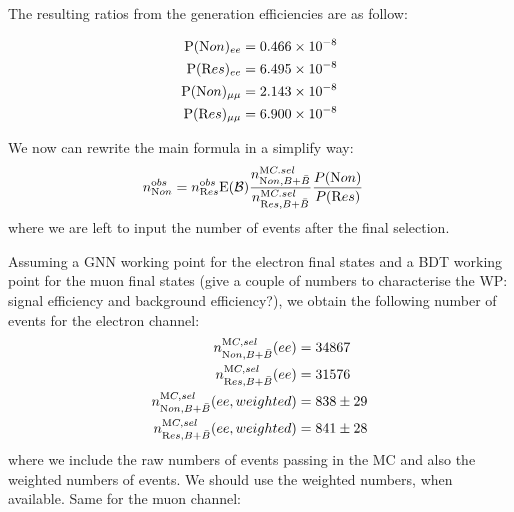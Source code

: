 
The resulting ratios from the generation efficiencies are as follow:

\begin{align}
{\textrm P}(\textrm Non)_{ee} = 0.466 \times 10^{-8}\\
{\textrm P}(\textrm Res)_{ee} = 6.495 \times 10^{-8}\\
{\textrm P}(\textrm Non)_{\mu\mu} = 2.143 \times 10^{-8}\\
{\textrm P}(\textrm Res)_{\mu\mu} = 6.900 \times 10^{-8}
\end{align}

We now can rewrite the main formula in a simplify way:
\begin{align}
n^{\textrm obs}_{\textrm Non} &= 
n^{\textrm obs}_{\textrm Res}
{\textrm E}(\mathcal{B})
\frac{n_{{\textrm Non},B+\bar B}^{\textrm MC.sel}}{n_{{\textrm Res},B+\bar B}^{\textrm MC.sel}}
\frac{P({\textrm Non})}{P({\textrm Res})}
\end{align}
where we are left to input the number of events after
the final selection.


Assuming a GNN working point for the electron final states
and a BDT working point for the muon final states
(give a couple of numbers to characterise the WP:
signal efficiency and background efficiency?),
we obtain the following number of events for the electron channel:
\begin{align}
  n_{{\textrm Non},{B+\bar B}}^{\textrm MC,sel}(ee) &= 34867\\
  n_{{\textrm Res},{B+\bar B}}^{\textrm MC,sel}(ee) &= 31576\\
  n_{{\textrm Non},B+\bar{B}}^{\textrm MC, sel}(ee,weighted) &= 838 \pm 29\\
  n_{{\textrm Res},B+\bar{B}}^{\textrm MC, sel}(ee,weighted) &= 841 \pm 28\\
\end{align}
where we include the raw numbers of events passing in the MC and
also the weighted numbers of events. We should use the weighted numbers,
when available. Same for the muon channel:

